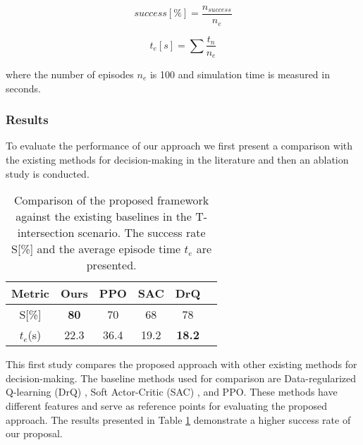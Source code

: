 \begin{equation}
	success [\%] = \frac{n_{success}}{n_{e}}
\end{equation}

\begin{equation}
	t_{e} [s] = \sum{\frac{t_n}{n_{e}}}
\end{equation}

where the number of episodes $n_{e}$ is 100 and simulation time is measured in seconds. 

\subsubsection{Results}
\label{subsubsec:8_decision_making_experimental_results_results}

To evaluate the performance of our approach we first present a comparison with the existing methods for decision-making in the literature and then an ablation study is conducted. 

\begin{table}[]
	\centering
	\captionsetup{justification=justified}
	\caption[Comparison of the proposed framework against the existing baselines in the T-intersection scenario]{Comparison of the proposed framework against the existing baselines in the T-intersection scenario. The success rate S[\%] and the average episode time $t_{e}$ are presented.}
	\label{table:comp}
	\begin{tabular}{c|ccccc} 
		\toprule
		Metric & Ours & PPO \cite{Gutierrez2022} & SAC \cite{haarnoja2019soft} & DrQ \cite{kostrikov2021image} \\
		\midrule
		S[\%] & \textbf{80} & 70 & 68 & 78 \\ 
		$t_{e}$(s) & 22.3 & 36.4 & 19.2 & \textbf{18.2} \\
		\bottomrule
	\end{tabular}
\end{table}

This first study compares the proposed approach with other existing methods for decision-making. The baseline methods used for comparison are Data-regularized Q-learning (DrQ) \cite{kostrikov2021image}, Soft Actor-Critic (SAC) \cite{haarnoja2019soft}, and PPO. These methods have different features and serve as reference points for evaluating the proposed approach. The results presented in Table \ref{table:comp} demonstrate a higher success rate of our proposal.

